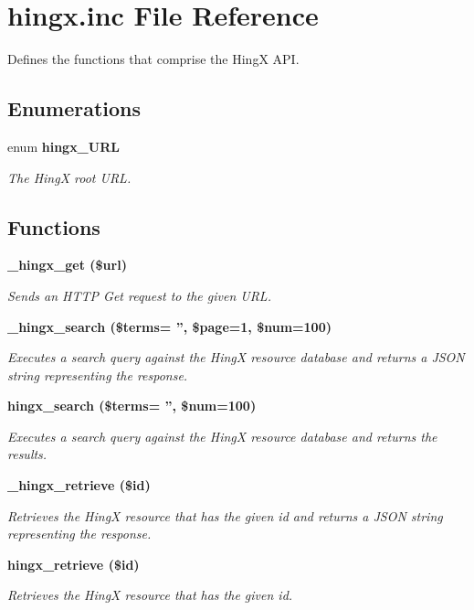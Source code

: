 \section{hingx.inc File Reference}
\label{hingx_8inc}
Defines the functions that comprise the Hing\-X API. 

\subsection*{Enumerations}
\begin{CompactItemize}
\item 
enum \bf{hingx\_\-URL} 
\begin{CompactList}\small\item\em The Hing\-X root URL. \item\end{CompactList}\end{CompactItemize}
\subsection*{Functions}
\begin{CompactItemize}
\item 
\bf{\_\-hingx\_\-get} (\$url)
\begin{CompactList}\small\item\em Sends an HTTP Get request to the given URL. \item\end{CompactList}\item 
\bf{\_\-hingx\_\-search} (\$terms= '', \$page=1, \$num=100)
\begin{CompactList}\small\item\em Executes a search query against the Hing\-X resource database and returns a JSON string representing the response. \item\end{CompactList}\item 
\bf{hingx\_\-search} (\$terms= '', \$num=100)
\begin{CompactList}\small\item\em Executes a search query against the Hing\-X resource database and returns the results. \item\end{CompactList}\item 
\bf{\_\-hingx\_\-retrieve} (\$id)
\begin{CompactList}\small\item\em Retrieves the Hing\-X resource that has the given id and returns a JSON string representing the response. \item\end{CompactList}\item 
\bf{hingx\_\-retrieve} (\$id)
\begin{CompactList}\small\item\em Retrieves the Hing\-X resource that has the given id. \item\end{CompactList}\end{CompactItemize}


